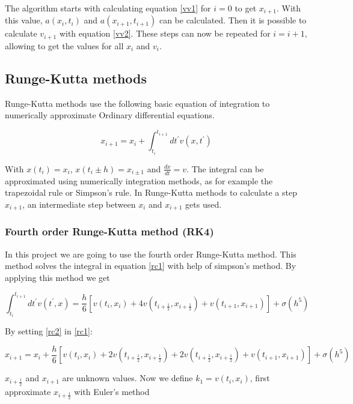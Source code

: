 \documentclass[10pt,a4paper]{article}
\begin{document}
The algorithm starts with calculating equation \eqref{vv1} for $i = 0$ to get $x_{i+1}$. With this value, $a(x_i, t_i)$ and $a(x_{i+1}, t_{i+1})$ can be calculated. Then it is possible to calculate $v_{i+1}$ with equation \eqref{vv2}. These steps can now be repeated for $i = i+1$, allowing to get the values for all $x_i$ and $v_i$.

\subsection{Runge-Kutta methods}

Runge-Kutta methods use the following basic equation of integration to numerically approximate Ordinary differential equations.

\begin{equation}
\label{rc1}
x_{i+1} = x_i + \int_{t_i}^{t_{i+1}} dt^{'} v(x, t^{'})
\end{equation}

With $x(t_i) = x_i$, $x(t_i \pm h) = x_{i \pm 1}$ and $\frac{dx}{dt} = v$. The integral can be approximated using numerically integration methods, as for example the trapezoidal rule or Simpson's rule. In Runge-Kutta methods to calculate a step $x_{i+1}$, an intermediate step between $x_i$ and $x_{i+1}$ gets used.

\subsubsection{Fourth order Runge-Kutta method (RK4)}
\label{subsubsec:rc4}

In this project we are going to use the fourth order Runge-Kutta method. This method solves the integral in equation \eqref{rc1} with help of simpson's method. By applying this method we get

\begin{equation}
\label{rc2}
\int_{t_i}^{t_{i+1}} dt^{'} v(t^{'}, x) = \frac{h}{6} [v(t_i, x_i) +4 v(t_{i+\frac{1}{2}}, x_{i+\frac{1}{2}}) + v(t_{i+1}, x_{i+1})] + \sigma(h^5)
\end{equation}

By setting \eqref{rc2} in \eqref{rc1}:

\begin{equation}
\label{rc3}
x_{i+1} = x_i + \frac{h}{6} [v(t_i, x_i) + 2 v(t_{i+\frac{1}{2}}, x_{i+\frac{1}{2}}) + 2 v(t_{i+\frac{1}{2}}, x_{i+\frac{1}{2}}) + v(t_{i+1}, x_{i+1})] + \sigma(h^5)
\end{equation}

$x_{i+\frac{1}{2}}$ and $x_{i+1}$ are unknown values. Now we define $k_1 = v(t_i, x_i)$, first approximate $x_{i+\frac{1}{2}}$ with Euler's method
\end{document}
